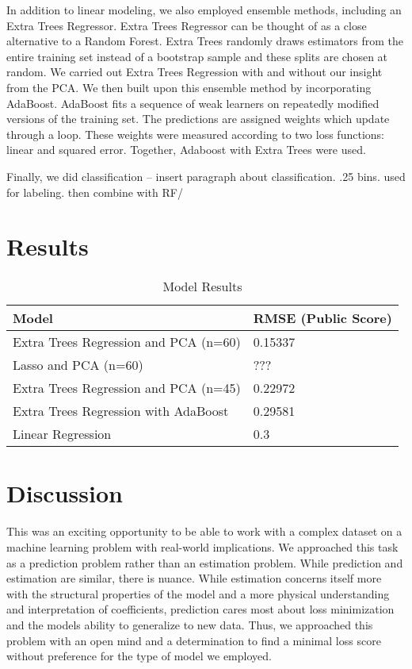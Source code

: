 \documentclass[11pt, oneside]{article}   	%
\begin{document}
In addition to linear modeling, we also employed ensemble methods, including an Extra Trees Regressor. Extra Trees Regressor can be thought of as a close alternative to a Random Forest. Extra Trees randomly draws estimators from the entire training set instead of a bootstrap sample and these splits are chosen at random. We carried out Extra Trees Regression with and without our insight from the PCA. We then built upon this ensemble method by incorporating AdaBoost. AdaBoost fits a sequence of weak learners on repeatedly modified versions of the training set. The predictions are assigned weights which update through a loop. These weights were measured according to two loss functions: linear and squared error. Together, Adaboost with Extra Trees were used.

Finally, we did classification --
insert paragraph about classification.
.25 bins. used for labeling. then combine with RF/

\section{Results}

\begin{table}[]
\centering

\label{my-label}
\begin{tabular}{@{}ll@{}}
\toprule
\textbf{Model} & \textbf{RMSE (Public Score)} \\ \midrule
Extra Trees Regression and PCA (n=60)  & 0.15337  \\
Lasso and PCA (n=60)  & ???  \\
Extra Trees Regression and PCA (n=45)   & 0.22972  \\
Extra Trees Regression with AdaBoost  & 0.29581  \\
Linear Regression & 0.3  \\ \bottomrule
\end{tabular}
\caption{Model Results}
\end{table}

\section{Discussion}
This was an exciting opportunity to be able to work with a complex dataset on a machine learning problem with real-world implications. We approached this task as a prediction problem rather than an estimation problem. While prediction and estimation are similar, there is nuance. While estimation concerns itself more with the structural properties of the model and a more physical understanding and interpretation of coefficients, prediction cares most about loss minimization and the models ability to generalize to new data. Thus, we approached this problem with an open mind and a determination to find a minimal loss score without preference for the type of model we employed. 
\end{document}
